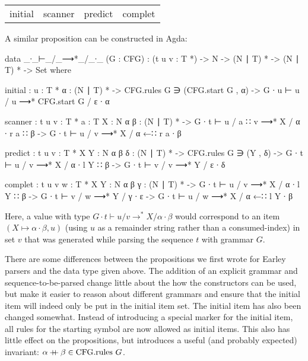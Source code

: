 		\begin{table}[h]
			\centering
			\begin{tabular}{cccc}
				initial & scanner & predict & complet
			\end{tabular}
		\end{table}

		A similar proposition can be constructed in Agda:

		\begin{code}

			data _∙_⊢_/_⟶*_/_∙_ (G : CFG) :
			  (t u v : T *) -> N -> (N ∣ T) * -> (N ∣ T) * -> Set where
			
			  initial : {u : T *} {α : (N ∣ T) *} ->
			    CFG.rules G ∋ (CFG.start G , α) ->
			    G ∙ u ⊢ u / u ⟶* CFG.start G / ε ∙ α
			
			  scanner : {t u v : T *} {a : T} {X : N} {α β : (N ∣ T) *} ->
			    G ∙ t ⊢ u / a ∷ v ⟶* X / α ∙ r a ∷ β ->
			      G ∙ t ⊢ u / v ⟶* X / α ←∷ r a ∙ β
			
			  predict : {t u v : T *} {X Y : N} {α β δ : (N ∣ T) *} -> 
			    CFG.rules G ∋ (Y , δ) ->
			    G ∙ t ⊢ u / v ⟶* X / α ∙ l Y ∷ β ->
			      G ∙ t ⊢ v / v ⟶* Y / ε ∙ δ
			
			  complet : {t u v w : T *} {X Y : N} {α β γ : (N ∣ T) *} ->
			    G ∙ t ⊢ u / v ⟶* X / α ∙ l Y ∷ β ->
			    G ∙ t ⊢ v / w ⟶* Y / γ ∙ ε ->
			      G ∙ t ⊢ u / w ⟶* X / α ←∷ l Y ∙ β

		\end{code}

		Here, a value with type $G \cdot t \vdash u / v \rightarrow^* X /
		\alpha \cdot \beta$ would correspond to an item $(X \mapsto \alpha
		\cdot \beta, u)$ (using $u$ as a remainder string rather than a
		consumed-index) in set $v$ that was generated while parsing the
		sequence $t$ with grammar $G$. 
		
		There are some differences between the propositions we first wrote for
		Earley parsers and the data type given above. The addition of an
		explicit grammar and sequence-to-be-parsed change little about the how
		the constructors can be used, but make it easier to reason about
		different grammars and ensure that the initial item will indeed only be
		put in the initial item set. The initial item has also been changed
		somewhat. Instead of introducing a special marker for the initial item,
		all rules for the starting symbol are now allowed as initial items.
		This also has little effect on the propositions, but introduces a
		useful (and probably expected) invariant: $\alpha \mathbin{{+}\mspace{-8mu}{+}} \beta \in 
		\textrm{CFG.rules } G$.
	
